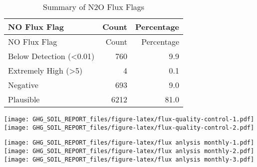 \documentclass[
]{article}
\begin{document}
\begin{longtable}[]{@{}lrr@{}}
\caption{Summary of N2O Flux Flags}\tabularnewline
\toprule()
NO Flux Flag & Count & Percentage \\
\midrule()
\endfirsthead
\toprule()
NO Flux Flag & Count & Percentage \\
\midrule()
\endhead
Below Detection (\textless0.01) & 760 & 9.9 \\
Extremely High (\textgreater5) & 4 & 0.1 \\
Negative & 693 & 9.0 \\
Plausible & 6212 & 81.0 \\
\bottomrule()
\end{longtable}

\texttt{[image: GHG\_SOIL\_REPORT\_files/figure-latex/flux-quality-control-1.pdf]}
\texttt{[image: GHG\_SOIL\_REPORT\_files/figure-latex/flux-quality-control-2.pdf]}

\texttt{[image: GHG\_SOIL\_REPORT\_files/figure-latex/flux anlysis monthly-1.pdf]}
\texttt{[image: GHG\_SOIL\_REPORT\_files/figure-latex/flux anlysis monthly-2.pdf]}
\texttt{[image: GHG\_SOIL\_REPORT\_files/figure-latex/flux anlysis monthly-3.pdf]}
\end{document}
